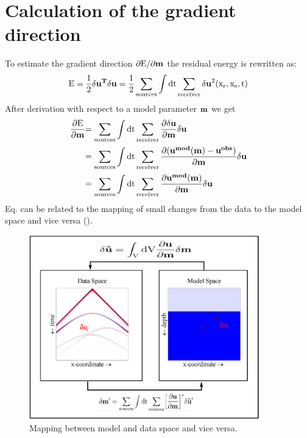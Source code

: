 \section{Calculation of the gradient direction}%
To estimate the gradient direction $\rm{\partial E/\partial \mathbf{m}}$ the residual energy is rewritten as:
\begin{equation} 
\rm{E = \frac{1}{2}\mathbf{\delta u^T} \mathbf{\delta u} = \frac{1}{2} \sum_{sources} \int dt \sum_{receiver} \mathbf{\delta u}^2(x_r, x_s, t) } 
\label{L2_continous}
\end{equation}
After derivation with respect to a model parameter $\rm{\mathbf{m}}$ we get
\begin{equation} 
\begin{split}
\rm{\frac{\partial E}{\partial \mathbf{m}}} &\rm{= \sum_{sources} \int dt \sum_{receiver} \frac{\partial \mathbf{\delta u}}{\partial
\mathbf{m}} \mathbf{\delta u}}\\ 
& \rm{= \sum_{sources} \int dt \sum_{receiver} \frac{\partial {(\mathbf{u^{mod}\mathbf(m)} - \mathbf{u^{obs}})}}{\partial
\mathbf{m}}  \mathbf{\delta u} }\\ 
&\rm{= \sum_{sources} \int dt \sum_{receiver} \frac{\partial {\mathbf{u^{mod}(\mathbf{m})}}}{\partial \mathbf{m}}  \mathbf{\delta u}} 
\label{dL2_dm}
\end{split}
\end{equation}
Eq.  can be related to the mapping of small changes from the data to the model space and vice versa (). 
\begin{figure}[ht]
\begin{center}
\includegraphics[width=10cm]{figures/mapping_data_model.pdf}
\caption{Mapping between model and data space and vice versa.}
\label{mapping_data_model}
\end{center}
\end{figure}
